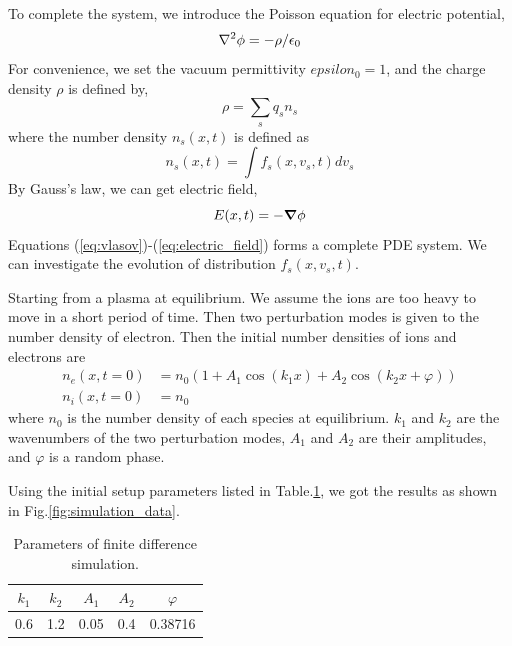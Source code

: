 \documentclass{article}
\begin{document}
    To complete the system, we introduce the Poisson equation for electric potential,
    \begin{equation} \label{eq:poisson}
        \laplacian\phi = -\rho/\epsilon_0
    \end{equation}
    For convenience, we set the vacuum permittivity $epsilon_0=1$, and the charge density $\rho$ is defined by,
    \begin{equation} \label{eq:charge_density}
        \rho = \sum_s q_sn_s
    \end{equation}
    where the number density $n_s(x,t)$ is defined as
    \begin{equation} \label{eq:number_density}
        n_s(x,t) = \int f_s(x,v_s,t) dv_s
    \end{equation}
    By Gauss's law, we can get electric field,
    \begin{equation}\label{eq:electric_field}
        E(x,t) = -\grad\phi
    \end{equation}
    Equations (\ref{eq:vlasov})-(\ref{eq:electric_field}) forms a complete PDE system. We can investigate the evolution of distribution $f_s(x,v_s,t)$.

    Starting from a plasma at equilibrium. We assume the ions are too heavy to move in a short period of time. Then two perturbation modes is given to the number density of electron. Then the initial number densities of ions and electrons are
    \begin{align} \label{eq:initial_conditions}
        n_e(x,t=0) &= n_0(1 + A_1\cos (k_1x) + A_2\cos (k_2x + \varphi)) \\
        n_i(x,t=0) &= n_0
    \end{align}
    where $n_0$ is the number density of each species at equilibrium. $k_1$ and $k_2$ are the wavenumbers of the two perturbation modes, $A_1$ and $A_2$ are their amplitudes, and $\varphi$ is a random phase.
    
    Using the initial setup parameters listed in Table.\ref{table:simulation_parameters}, we got the results as shown in Fig.\ref{fig:simulation_data}.
    \begin{table} [H]
        \centering
        \caption{Parameters of finite difference simulation.}
        \begin{tabular}{ccccc}
            \hline
            \hline
            $k_1$ & $k_2$ & $A_1$ & $A_2$ & $\varphi$ \\
            \hline
            0.6 & 1.2 & 0.05 & 0.4 & 0.38716 \\
            \hline
            \hline
        \end{tabular}
        \label{table:simulation_parameters}
    \end{table}
    
\end{document}
